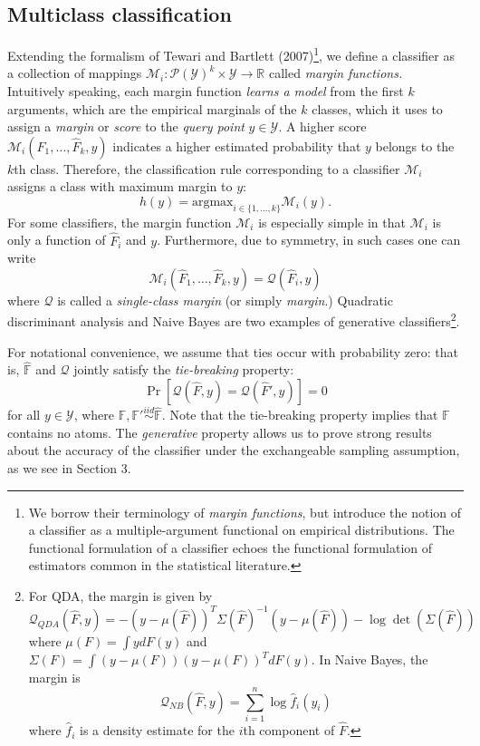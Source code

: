 \documentclass{article}
\newcommand{\argmax}{\text{argmax}}
\begin{document}
\subsection{Multiclass classification}

Extending the formalism of Tewari and Bartlett (2007)\footnote{We borrow their terminology of \emph{margin functions}, but introduce the notion of a classifier as a multiple-argument functional on empirical distributions.  
The functional formulation of a classifier echoes the functional formulation of estimators common in the statistical literature.},
we define a classifier as a collection of mappings
$\mathcal{M}_i: \mathcal{P}(\mathcal{Y})^k \times \mathcal{Y} \to \mathbb{R}$ called \emph{margin functions.}
Intuitively speaking, each margin function \emph{learns a model} from the first $k$ arguments, which are
the empirical marginals of the $k$ classes, which it uses to assign a \emph{margin} or \emph{score} to the
\emph{query point} $y \in \mathcal{Y}$.  A higher score $\mathcal{M}_i(\hat{F}_1,\hdots, \hat{F}_k, y)$ indicates a higher estimated probability that $y$ belongs to the $k$th class.  
Therefore, the classification rule corresponding to a classifier $\mathcal{M}_i$ assigns
a class with maximum margin to $y$:
\[
h(y) = \argmax_{i \in \{1,\hdots, k\}} \mathcal{M}_i(y).
\]
For some classifiers, the margin function $\mathcal{M}_i$ is especially simple
in that $\mathcal{M}_i$ is only a function of $\hat{F}_i$ and $y$.
Furthermore, due to symmetry, in such cases one can write
\[
\mathcal{M}_i(\hat{F}_1,\hdots, \hat{F}_k, y) = \mathcal{Q}(\hat{F}_i, y)
\]
where $\mathcal{Q}$ is called a \emph{single-class margin} (or simply \emph{margin}.)
Quadratic discriminant analysis and Naive Bayes are two examples of
generative classifiers\footnote{For QDA, the margin is given by
\[
\mathcal{Q}_{QDA}(\hat{F}, y) = -(y - \mu(\hat{F}))^T \Sigma(\hat{F})^{-1} (y-\mu(\hat{F})) - \log\det(\Sigma(\hat{F}))
\]
where $\mu(F) = \int y dF(y)$ and $\Sigma(F) = \int (y-\mu(F))(y-\mu(F))^T dF(y)$.
In Naive Bayes, the margin is
\[
\mathcal{Q}_{NB}(\hat{F},  y) = \sum_{i=1}^n \log \hat{f}_i(y_i)
\]
where $\hat{f}_i$ is a density estimate for the $i$th component of
$\hat{F}$.}.

For notational convenience, we assume that ties occur with probability
zero: that is, $\hat{\mathbb{F}}$ and $\mathcal{Q}$ jointly satisfy the
\emph{tie-breaking} property:
\begin{equation}\label{eq:tie}
\Pr[\mathcal{Q}(\hat{F}, y) = \mathcal{Q}(\hat{F}', y)] = 0
\end{equation}
for all $y \in \mathcal{Y}$, where $\mathbb{F}, \mathbb{F}' \stackrel{iid}{\sim} \hat{\mathbb{F}}$.
Note that the tie-breaking property implies that $\mathbb{F}$ contains no atoms.
The \emph{generative} property allows us to prove strong results about the accuracy of the classifier
under the exchangeable sampling assumption, as we see in Section 3.
\end{document}
